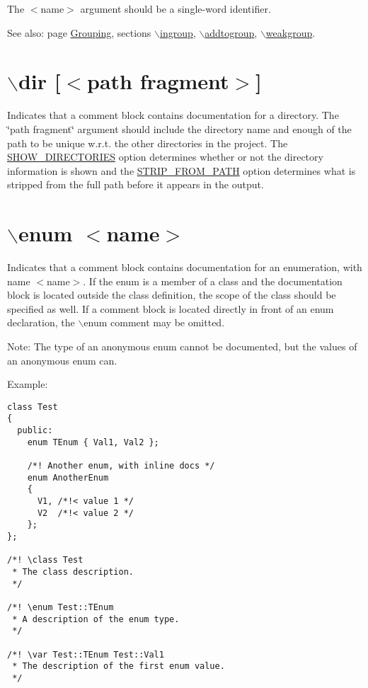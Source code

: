 The $<$name$>$ argument should be a single-word identifier.

\begin{Desc}
\item[See also:]page \hyperlink{grouping}{Grouping}, sections \hyperlink{commands_cmdingroup}{$\backslash$ingroup}, \hyperlink{commands_cmdaddtogroup}{$\backslash$addtogroup}, \hyperlink{commands_cmdweakgroup}{$\backslash$weakgroup}.\end{Desc}


 \hypertarget{commands_cmddir}{}\section{$\backslash$dir \mbox{[}$<$path fragment$>$\mbox{]}}\label{commands_cmddir}
 Indicates that a comment block contains documentation for a directory. The \char`\"{}path fragment\char`\"{} argument should include the directory name and enough of the path to be unique w.r.t. the other directories in the project. The \hyperlink{config_cfg_show_dirs}{SHOW\_\-DIRECTORIES} option determines whether or not the directory information is shown and the \hyperlink{config_cfg_strip_from_path}{STRIP\_\-FROM\_\-PATH} option determines what is stripped from the full path before it appears in the output.



\hypertarget{commands_cmdenum}{}\section{$\backslash$enum $<$name$>$}\label{commands_cmdenum}
 Indicates that a comment block contains documentation for an enumeration, with name $<$name$>$. If the enum is a member of a class and the documentation block is located outside the class definition, the scope of the class should be specified as well. If a comment block is located directly in front of an enum declaration, the $\backslash$enum comment may be omitted.

\begin{Desc}
\item[Note:]The type of an anonymous enum cannot be documented, but the values of an anonymous enum can.\end{Desc}
\begin{Desc}
\item[Example:]

\begin{VerbInclude}\begin{verbatim}class Test
{
  public:
    enum TEnum { Val1, Val2 };

    /*! Another enum, with inline docs */
    enum AnotherEnum 
    { 
      V1, /*!< value 1 */
      V2  /*!< value 2 */
    };
};

/*! \class Test
 * The class description.
 */

/*! \enum Test::TEnum
 * A description of the enum type.
 */

/*! \var Test::TEnum Test::Val1
 * The description of the first enum value.
 */
\end{verbatim}
\end{VerbInclude}
 \end{Desc}


